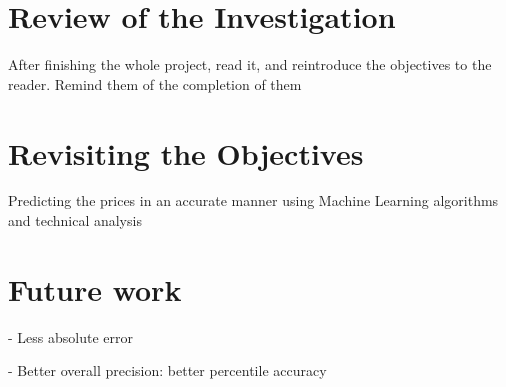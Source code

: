 \documentclass[12pt]{report} %
\begin{document}
\section{Review of the Investigation} %
After finishing the whole project, read it, and reintroduce the objectives to the reader. Remind them of the completion of them


\section{Revisiting the Objectives}
Predicting the prices in an accurate manner using Machine Learning algorithms and technical analysis


\section{Future work}
- Less absolute error

- Better overall precision: better percentile accuracy




\clearpage
{}

\printbibliography




\end{document}
